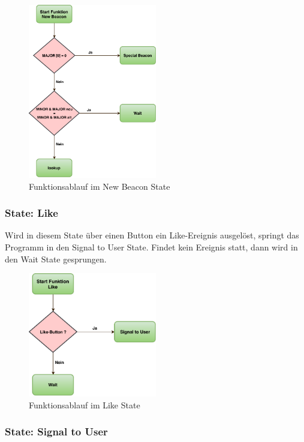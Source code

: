 \begin{figure}[htbp!!!!]
	\centering
	\includegraphics[width=0.5\textwidth]{Data/NewBeacon_picture.pdf}
	\caption[Statemachine: New Beacon]{Funktionsablauf im New Beacon State}
	\label{fig:newBeaconState}
\end{figure} 

\subsubsection*{State: Like}

Wird in diesem State über einen Button ein Like-Ereignis ausgelöst, springt das Programm in den Signal to User State. Findet kein Ereignis statt, dann wird in den Wait State gesprungen.

\begin{figure}[htbp!!!!]
	\centering
	\includegraphics[width=0.5\textwidth]{Data/Like_picture.pdf}
	\caption[Statemachine: Like]{Funktionsablauf im Like State}
	\label{fig:likeState}
\end{figure} 

\subsubsection*{State: Signal to User}

